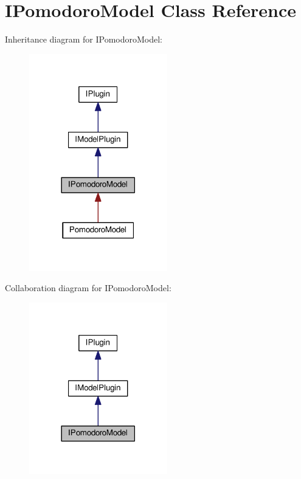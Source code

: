 \hypertarget{class_i_pomodoro_model}{}\section{I\+Pomodoro\+Model Class Reference}
\label{class_i_pomodoro_model}


Inheritance diagram for I\+Pomodoro\+Model\+:\nopagebreak
\begin{figure}[H]
\begin{center}
\leavevmode
\includegraphics[width=170pt]{class_i_pomodoro_model__inherit__graph}
\end{center}
\end{figure}


Collaboration diagram for I\+Pomodoro\+Model\+:\nopagebreak
\begin{figure}[H]
\begin{center}
\leavevmode
\includegraphics[width=170pt]{class_i_pomodoro_model__coll__graph}
\end{center}
\end{figure}
